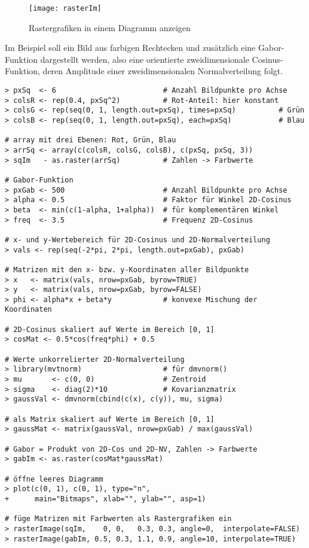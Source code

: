 \begin{figure}[ht]
\centering
\texttt{[image: rasterIm]}
\vspace*{-1em}
\caption{Rastergrafiken in einem Diagramm anzeigen}
\label{fig:rasterIm}
\end{figure}

Im Beispiel soll ein Bild aus farbigen Rechtecken und zusätzlich eine Gabor-Funktion dargestellt werden, also eine orientierte zweidimensionale Cosinus-Funktion, deren Amplitude einer zweidimensionalen Normalverteilung folgt.
\begin{lstlisting}
> pxSq  <- 6                         # Anzahl Bildpunkte pro Achse
> colsR <- rep(0.4, pxSq^2)          # Rot-Anteil: hier konstant
> colsG <- rep(seq(0, 1, length.out=pxSq), times=pxSq)          # Grün
> colsB <- rep(seq(0, 1, length.out=pxSq), each=pxSq)           # Blau

# array mit drei Ebenen: Rot, Grün, Blau
> arrSq <- array(c(colsR, colsG, colsB), c(pxSq, pxSq, 3))
> sqIm   - as.raster(arrSq)          # Zahlen -> Farbwerte

# Gabor-Funktion
> pxGab <- 500                       # Anzahl Bildpunkte pro Achse
> alpha <- 0.5                       # Faktor für Winkel 2D-Cosinus
> beta  <- min(c(1-alpha, 1+alpha))  # für komplementären Winkel
> freq  <- 3.5                       # Frequenz 2D-Cosinus

# x- und y-Wertebereich für 2D-Cosinus und 2D-Normalverteilung
> vals <- rep(seq(-2*pi, 2*pi, length.out=pxGab), pxGab)

# Matrizen mit den x- bzw. y-Koordinaten aller Bildpunkte
> x   <- matrix(vals, nrow=pxGab, byrow=TRUE)
> y   <- matrix(vals, nrow=pxGab, byrow=FALSE)
> phi <- alpha*x + beta*y            # konvexe Mischung der Koordinaten

# 2D-Cosinus skaliert auf Werte im Bereich [0, 1]
> cosMat <- 0.5*cos(freq*phi) + 0.5

# Werte unkorrelierter 2D-Normalverteilung
> library(mvtnorm)                   # für dmvnorm()
> mu       <- c(0, 0)                # Zentroid
> sigma    <- diag(2)*10             # Kovarianzmatrix
> gaussVal <- dmvnorm(cbind(c(x), c(y)), mu, sigma)

# als Matrix skaliert auf Werte im Bereich [0, 1]
> gaussMat <- matrix(gaussVal, nrow=pxGab) / max(gaussVal)

# Gabor = Produkt von 2D-Cos und 2D-NV, Zahlen -> Farbwerte
> gabIm <- as.raster(cosMat*gaussMat)

# öffne leeres Diagramm
> plot(c(0, 1), c(0, 1), type="n",
+      main="Bitmaps", xlab="", ylab="", asp=1)

# füge Matrizen mit Farbwerten als Rastergrafiken ein
> rasterImage(sqIm,    0, 0,   0.3, 0.3, angle=0,  interpolate=FALSE)
> rasterImage(gabIm, 0.5, 0.3, 1.1, 0.9, angle=10, interpolate=TRUE)
\end{lstlisting}

